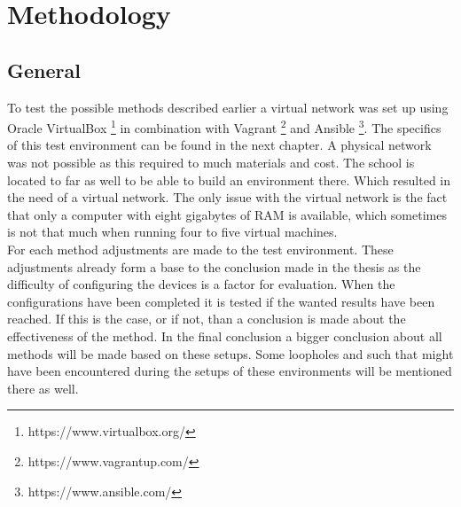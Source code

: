 
\chapter{Methodology}
\label{ch:methodologie}

\section{General}
To test the possible methods described earlier a virtual network was set up using Oracle VirtualBox \footnote{ https://www.virtualbox.org/} in combination with Vagrant \footnote{https://www.vagrantup.com/} and Ansible \footnote{https://www.ansible.com/}. The specifics of this test environment can be found in the next chapter. A physical network was not possible as this required to much materials and cost. The school is located to far as well to be able to build an environment there. Which resulted in the need of a virtual network. The only issue with the virtual network is the fact that only a computer with eight gigabytes of RAM is available, which sometimes is not that much when running four to five virtual machines.\\

For each method adjustments are made to the test environment. These adjustments already form a base to the conclusion made in the thesis as the difficulty of configuring the devices is a factor for evaluation. When the configurations have been completed it is tested if the wanted results have been reached. If this is the case, or if not, than a conclusion is made about the effectiveness of the method. In the final conclusion a bigger conclusion about all methods will be made based on these setups. Some loopholes and such that might have been encountered during the setups of these environments will be mentioned there as well.\\
